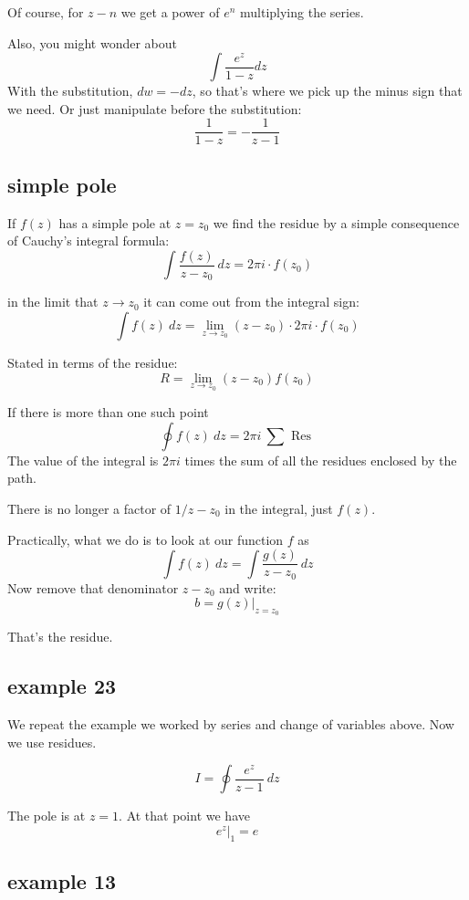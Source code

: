 \documentclass[11pt, oneside]{article}
\begin{document}
Of course, for $z - n$ we get a power of $e^n$ multiplying the series.

Also, you might wonder about 
\[ \int \frac{e^z}{1 - z} dz \]
With the substitution, $dw = - dz$, so that's where we pick up the minus sign that we need.  Or just manipulate before the substitution:
\[ \frac{1}{1 - z} = - \frac{1}{z - 1} \]

\subsection*{simple pole}

If $f(z)$ has a simple pole at $z = z_0$ we find the residue by a simple consequence of Cauchy's integral formula:
\[ \int \frac{f(z)}{z - z_0} \ dz = 2 \pi i \cdot f(z_0) \]

in the limit that $z \rightarrow z_0$ it can come out from the integral sign:
\[ \int f(z) \ dz = \lim_{z \rightarrow z_0} (z - z_0) \cdot 2 \pi i \cdot f(z_0) \]

Stated in terms of the residue: 
\[ R = \lim_{z \rightarrow z_0} (z - z_0) f(z_0) \]

If there is more than one such point
\[ \oint f(z) \ dz = 2 \pi i \ \sum \text{ Res } \]
The value of the integral is $2 \pi i$ times the sum of all the residues enclosed by the path.

There is no longer a factor of $1/z-z_0$ in the integral, just $f(z)$.

Practically, what we do is to look at our function $f$ as
\[ \int f(z) \ dz = \int \frac{g(z)}{z - z_0} \ dz \]
Now remove that denominator $z - z_0$ and write:
\[ b = g(z) \bigg |_{z=z_0} \]

That's the residue.

\subsection*{example 23}

\label{sec:ex23R}

We repeat the example we worked by series and change of variables above.  Now we use residues.

\[ I = \oint \frac{e^z}{z - 1} \ dz \]

The pole is at $z = 1$.  At that point we have
\[ e^z \bigg |_1 = e \]

\subsection*{example 13}
\end{document}
